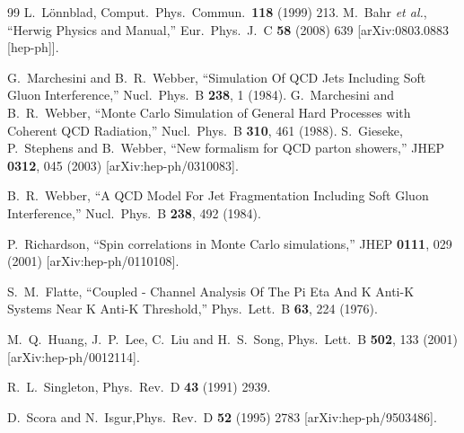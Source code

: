 \documentclass{article}
\begin{document}
\begin{thebibliography}{99}
 L.~L\"onnblad, Comput.~Phys.~Commun.\ {\bf 118} (1999) 213.
  M.~Bahr {\it et al.},
  ``Herwig Physics and Manual,''
  Eur.\ Phys.\ J.\  C {\bf 58} (2008) 639
  [arXiv:0803.0883 [hep-ph]].

  G.~Marchesini and B.~R.~Webber,
  ``Simulation Of QCD Jets Including Soft Gluon Interference,''
  Nucl.\ Phys.\  B {\bf 238}, 1 (1984).
  G.~Marchesini and B.~R.~Webber,
   ``Monte Carlo Simulation of General Hard Processes with Coherent QCD
  Radiation,''
  Nucl.\ Phys.\  B {\bf 310}, 461 (1988).
  S.~Gieseke, P.~Stephens and B.~Webber,
  ``New formalism for QCD parton showers,''
  JHEP {\bf 0312}, 045 (2003)
  [arXiv:hep-ph/0310083].

  B.~R.~Webber,
  ``A QCD Model For Jet Fragmentation Including Soft Gluon Interference,''
  Nucl.\ Phys.\  B {\bf 238}, 492 (1984).

  P.~Richardson,
  ``Spin correlations in Monte Carlo simulations,''
  JHEP {\bf 0111}, 029 (2001)
  [arXiv:hep-ph/0110108].

  S.~M.~Flatte,
   ``Coupled - Channel Analysis Of The Pi Eta And K Anti-K Systems Near K Anti-K
  Threshold,''
  Phys.\ Lett.\  B {\bf 63}, 224 (1976).

  M.~Q.~Huang, J.~P.~Lee, C.~Liu and H.~S.~Song,
  Phys.\ Lett.\  B {\bf 502}, 133 (2001)
  [arXiv:hep-ph/0012114].

  R.~L.~Singleton,
  Phys.\ Rev.\  D {\bf 43} (1991) 2939.

 D.~Scora and N.~Isgur,Phys.\ Rev.\  D {\bf 52} (1995) 2783 [arXiv:hep-ph/9503486].


\end{thebibliography}
\end{document}
